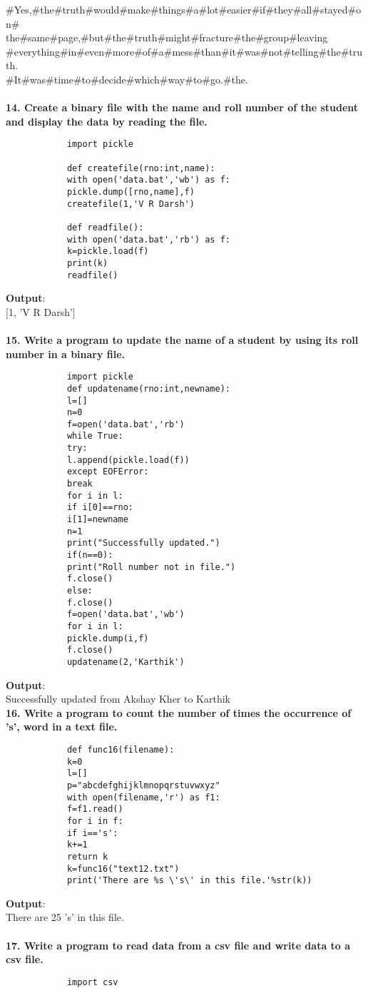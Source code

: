 \documentclass[
a4paper]{article}
\begin{document}
\begin{large}
		\#Yes,\#the\#truth\#would\#make\#things\#a\#lot\#easier\#if\#they\#all\#stayed\#on\#\\the\#same\#page,\#but\#the\#truth\#might\#fracture\#the\#group\#leaving\\\#everything\#in\#even\#more\#of\#a\#mess\#than\#it\#was\#not\#telling\#the\#truth.\\\#It\#was\#time\#to\#decide\#which\#way\#to\#go.\#the.\\
		\textbf{\\14. Create a binary file with the name and roll number of the student and display the data by reading the file.}
		\begin{verbatim}
			import pickle
			
			def createfile(rno:int,name):
			with open('data.bat','wb') as f:
			pickle.dump([rno,name],f)
			createfile(1,'V R Darsh')
			
			def readfile():
			with open('data.bat','rb') as f:
			k=pickle.load(f)
			print(k)
			readfile()
		\end{verbatim}
		\textbf{Output}:\\
		$[$1, 'V R Darsh'$]$\\
		\textbf{\\15. Write a pro}\textbf{gram to update the name of a student by using its roll number in a binary file.}
		\begin{verbatim}
			import pickle
			def updatename(rno:int,newname):
			l=[]
			n=0
			f=open('data.bat','rb')
			while True:
			try:
			l.append(pickle.load(f))
			except EOFError:
			break
			for i in l:
			if i[0]==rno:
			i[1]=newname
			n=1
			print("Successfully updated.")
			if(n==0):
			print("Roll number not in file.")
			f.close()
			else:
			f.close()
			f=open('data.bat','wb')
			for i in l:
			pickle.dump(i,f)
			f.close()
			updatename(2,'Karthik')
		\end{verbatim}
		\textbf{Output}:\\
		Successfully updated from Akshay Kher to Karthik
		\\\textbf{16. Write a program to count the number of times the occurrence of 's', word in a text file.}
		\begin{verbatim}
			def func16(filename):
			k=0
			l=[]
			p="abcdefghijklmnopqrstuvwxyz"
			with open(filename,'r') as f1:
			f=f1.read()
			for i in f:
			if i=='s':
			k+=1
			return k
			k=func16("text12.txt")
			print('There are %s \'s\' in this file.'%str(k))    
		\end{verbatim}
		\textbf{Output}:\\
		There are 25 's' in this file.\\
		\\ \textbf{17. Write a program to read data from a csv file and write data to a csv file.}
		\begin{verbatim}
			import csv
			

\end{verbatim}
\end{large}
\end{document}
